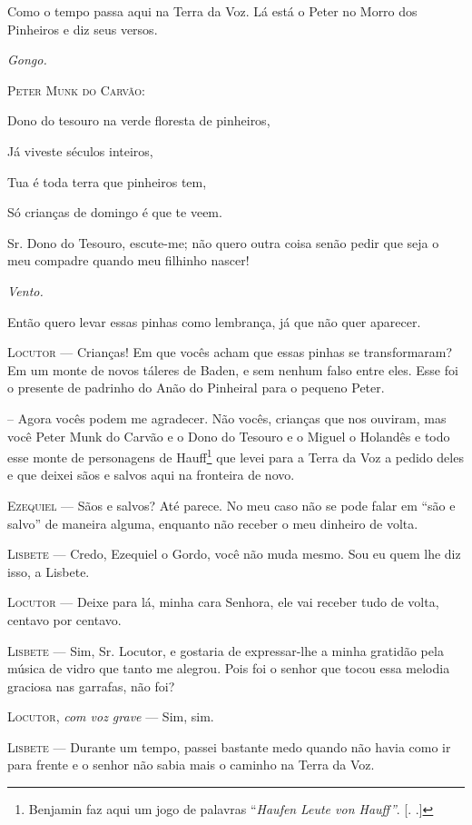 Como o tempo passa aqui na Terra da Voz. Lá está o Peter no Morro dos
Pinheiros e diz seus versos.

\emph{Gongo.}

\textsc{Peter Munk do Carvão}:

Dono do tesouro na verde floresta de pinheiros,

Já viveste séculos inteiros,

Tua é toda terra que pinheiros tem,

Só crianças de domingo é que te veem.

Sr. Dono do Tesouro, escute-me; não quero outra coisa senão pedir que
seja o meu compadre quando meu filhinho nascer!

\emph{Vento.}

Então quero levar essas pinhas como lembrança, já que não quer aparecer.

\textsc{Locutor} --- Crianças! Em que vocês acham que essas pinhas se
transformaram? Em um monte de novos táleres de Baden, e sem nenhum falso
entre eles. Esse foi o presente de padrinho do Anão do Pinheiral para o
pequeno Peter.

-- Agora vocês podem me agradecer. Não vocês, crianças que nos ouviram,
mas você Peter Munk do Carvão e o Dono do Tesouro e o Miguel o Holandês
e todo esse monte de personagens de Hauff\footnote{Benjamin faz aqui um
  jogo de palavras ``\emph{Haufen} \emph{Leute von Hauff''}. [.
  .]} que levei para a Terra da Voz a pedido deles e que deixei sãos
e salvos aqui na fronteira de novo.

\textsc{Ezequiel} --- Sãos e salvos? Até parece. No meu caso não se pode falar em
``são e salvo'' de maneira alguma, enquanto não receber o meu dinheiro
de volta.

\textsc{Lisbete} --- Credo, Ezequiel o Gordo, você não muda mesmo. Sou eu quem lhe
diz isso, a Lisbete.

\textsc{Locutor} --- Deixe para lá, minha cara Senhora, ele vai receber tudo de
volta, centavo por centavo.

\textsc{Lisbete} --- Sim, Sr. Locutor, e gostaria de expressar-lhe a minha
gratidão pela música de vidro que tanto me alegrou. Pois foi o senhor
que tocou essa melodia graciosa nas garrafas, não foi?

\textsc{Locutor}, \emph{com voz grave} --- Sim, sim.

\textsc{Lisbete} --- Durante um tempo, passei bastante medo quando não havia como
ir para frente e o senhor não sabia mais o caminho na Terra da Voz.

